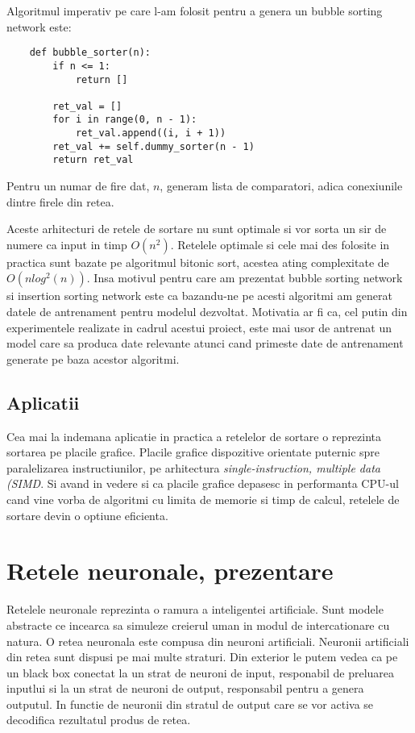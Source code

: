 \documentclass[12pt]{article}
\begin{document}
Algoritmul imperativ pe care l-am folosit pentru a genera un bubble sorting network este:
\begin{lstlisting}
    def bubble_sorter(n):
        if n <= 1:
            return []

        ret_val = []
        for i in range(0, n - 1):
            ret_val.append((i, i + 1))
        ret_val += self.dummy_sorter(n - 1)
        return ret_val
\end{lstlisting}
Pentru un numar de fire dat, $n$, generam lista de comparatori, adica conexiunile dintre firele din retea.

    Aceste arhitecturi de retele de sortare nu sunt optimale si vor sorta un sir de numere ca input in timp
$O(n^2)$. Retelele optimale si cele mai des folosite in practica sunt bazate pe algoritmul bitonic sort, acestea ating complexitate de $O(nlog^2(n))$. Insa motivul pentru care am prezentat bubble sorting network si insertion sorting network este
ca bazandu-ne pe acesti algoritmi am generat datele de antrenament pentru modelul dezvoltat. Motivatia ar fi ca, cel putin din experimentele realizate in cadrul acestui proiect, este mai usor de antrenat un model care sa produca date relevante atunci cand primeste date de antrenament generate pe baza acestor algoritmi.

\subsection{Aplicatii}
Cea mai la indemana aplicatie in practica a retelelor de sortare o reprezinta sortarea pe placile grafice. Placile grafice dispozitive orientate puternic spre paralelizarea instructiunilor, pe arhitectura \textit{single-instruction, multiple data (SIMD}. Si avand in vedere si ca placile grafice depasesc in performanta CPU-ul cand vine vorba de algoritmi cu limita de memorie si timp de calcul, retelele de sortare devin o optiune eficienta.


\section{Retele neuronale, prezentare}

Retelele neuronale reprezinta o ramura a inteligentei artificiale. Sunt modele abstracte ce incearca sa simuleze creierul uman
in modul de intercationare cu natura. O retea neuronala este compusa din neuroni artificiali. Neuronii artificiali din retea sunt dispusi pe mai multe straturi. Din exterior le putem vedea ca pe un black box conectat la un strat de neuroni de input, responabil de preluarea inputlui si la un strat de neuroni de output, responsabil pentru a genera outputul. In functie de neuronii din stratul de output care se vor activa se decodifica rezultatul produs de retea.
\end{document}
